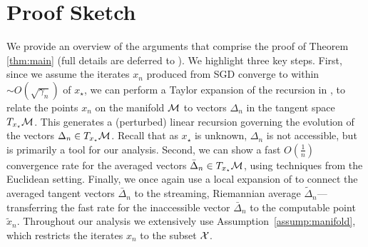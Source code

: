\section{Proof Sketch} \label{sec:pfsketch}
\vspace{-1.22pt}
We provide an overview of the arguments that comprise the proof of Theorem \ref{thm:main} (full details are deferred to ). We highlight three key steps. First, since we assume the iterates $x_n$
produced from SGD converge to within $\sim O(\sqrt{\gamma_n})$ of $x_\star$, we can perform a
Taylor expansion of the recursion in , to relate the points $x_n$ on the manifold $\mathcal{M}$ to vectors $\Delta_n$ in the tangent space $T_{x_\star}\mathcal{M}$. This
generates a (perturbed) linear recursion governing the evolution of the vectors $\Delta_n \in T_{x_\star} \mathcal{M}$.
Recall that as $x_\star$ is unknown, $\Delta_n$ is not accessible, but is primarily a tool for our analysis. Second, we can show a fast $O(\frac{1}{n})$ convergence rate for the averaged vectors $\bar{\Delta}_n \in T_{x_\star} \mathcal{M}$, using techniques from the Euclidean setting.
Finally, we once again use a local expansion of  to connect the averaged tangent vectors $\bar \Delta_n$ to the streaming, Riemannian average $\tilde \Delta_n$---transferring the fast rate for the inaccessible vector $\bar{\Delta}_n$ to the computable point $\tilde x_n$.
Throughout our analysis we extensively use Assumption~\ref{assump:manifold}, which restricts the iterates $x_n$ to the subset $\mathcal{X}$.
\vspace{-4.11pt}
